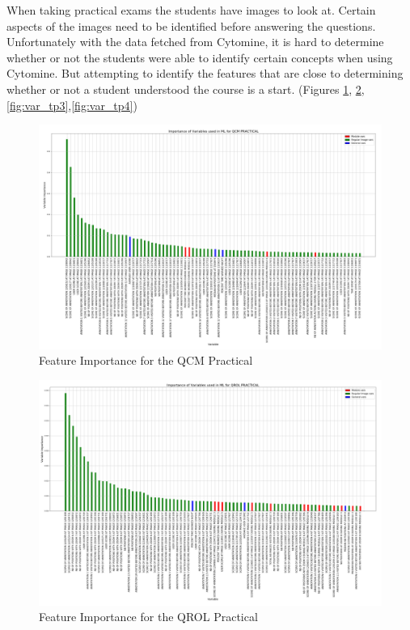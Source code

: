 \documentclass[a4paper,11pt]{report}
\numberwithin{figure}{chapter} %
\begin{document}
    When taking practical exams the students have images to look at.
    Certain aspects of the images need to be identified before answering the questions.
    Unfortunately with the data fetched from Cytomine, it is hard to determine whether or not the students were able to identify certain concepts when using Cytomine.
    But attempting to identify the features that are close to determining whether or not a student understood the course is a start. (Figures \ref{fig:var_tp1}, \ref{fig:var_tp2}, \ref{fig:var_tp3},\ref{fig:var_tp4})

     \begin{figure}[H]
      \centering
      \includegraphics[width=.95\linewidth]{plots/var_importance_QCM_PRACTICAL_2018-04-29_14_38_13.png}
      \caption{Feature Importance for the QCM Practical}
      \label{fig:var_tp1}
      \end{figure}

      \begin{figure}[H]
      \centering
      \includegraphics[width=.95\linewidth]{plots/var_importance_QROL_PRACTICAL_2018-04-29_14_37_04.png}
      \caption{Feature Importance for the QROL Practical}
      \label{fig:var_tp2}
      \end{figure}
\end{document}
